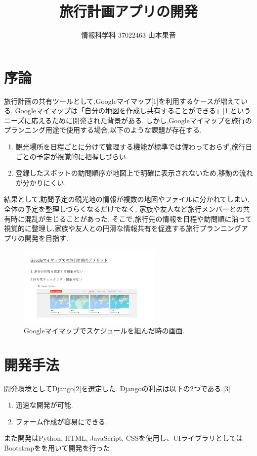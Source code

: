 \documentclass[a4j,twocolumn]{jsarticle}
\begin{document}
  \title{旅行計画アプリの開発}
  \author{情報科学科 \hspace{5mm} 37022463 \hspace{5mm} 山本果音}
  \date{}

  \maketitle


\section{序論}
\label{sec:orge261f79}
旅行計画の共有ツールとして,Googleマイマップ[1]を利用するケースが増えている.
Googleマイマップは「自分の地図を作成し共有することができる」[1]というニーズに応えるために開発された背景がある.
しかし,Googleマイマップを旅行のプランニング用途で使用する場合,以下のような課題が存在する.
\begin{enumerate}
\item 観光場所を日程ごとに分けて管理する機能が標準では備わっておらず,旅行日ごとの予定が視覚的に把握しづらい.
\item 登録したスポットの訪問順序が地図上で明確に表示されないため,移動の流れが分かりにくい.
\end{enumerate}
結果として,訪問予定の観光地の情報が複数の地図やファイルに分かれてしまい, 全体の予定を整理しづらくなるだけでなく,
家族や友人など旅行メンバーとの共有時に混乱が生じることがあった.
そこで,旅行先の情報を日程や訪問順に沿って視覚的に整理し,家族や友人との円滑な情報共有を促進する旅行プランニングアプリの開発を目指す.



\begin{figure}[htbp]
\centering
\includegraphics[width=7cm]{./figs/map.PNG}
\caption{\label{fig:org7ed5ef8}Googleマイマップでスケジュールを組んだ時の画面.}
\end{figure}


\section{開発手法}
\label{sec:org0921bf9}
開発環境としてDjango[2]を選定した.
Djangoの利点は以下の2つである.[3]
\begin{enumerate}
\item 迅速な開発が可能.
\item フォーム作成が容易にできる.
\end{enumerate}
また開発はPython, HTML, JavaScript, CSSを使用し、UIライブラリとしてはBootstrapをを用いて開発を行った.
\end{document}
